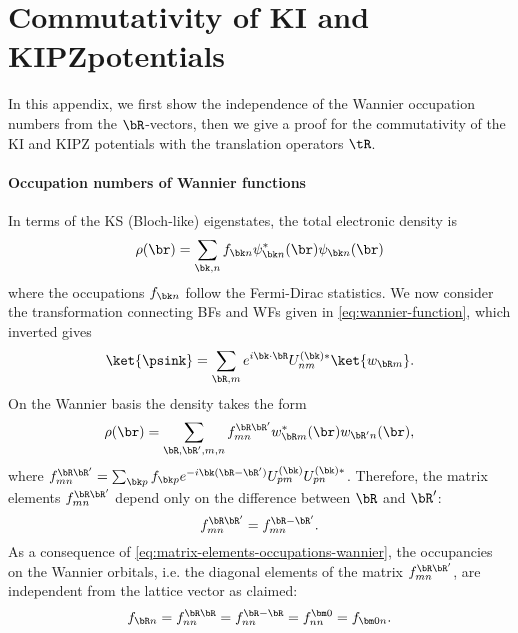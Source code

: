 \chapter[Commutativity of KI and KIPZ potentials]{Commutativity of KI and KIPZ\break potentials\label{app:commutativity-ki-kipz}}
In this appendix, we first show the independence of the Wannier occupation numbers from the $\bR$-vectors, then we give a proof for the commutativity of the KI and KIPZ potentials with the translation operators $\tR$.

\subsubsection*{Occupation numbers of Wannier functions}
In terms of the KS (Bloch-like) eigenstates, the total electronic density is
%
\begin{equation}
    \rho(\br) = \sum_{\bk,n} f_{\bk n} \psi^*_{\bk n}(\br) \psi_{\bk n}(\br)
    \label{eq:density-bloch}
\end{equation}
%
where the occupations $f_{\bk n}$ follow the Fermi-Dirac statistics. We now consider the transformation connecting BFs and WFs given in \cref{eq:wannier-function}, which inverted gives
%
\begin{equation}
    \ket{\psink} = \sum_{\bR,m} e^{i\bk \cdot \bR} U^{(\bk)*}_{nm} \ket{w_{\bR m}} .
    \label{eq:bloch-wannier}
\end{equation}
%
On the Wannier basis the density takes the form
%
\begin{equation}
    \rho(\br) = \sum_{\bR,\bR',m,n} f_{mn}^{\bR\bR'} w^*_{\bR m}(\br) w_{\bR' n}(\br) , 
\end{equation}
%
where $f_{mn}^{\bR\bR'} = \sum_{\bk p} f_{\bk p} e^{-i\bk(\bR-\bR')} U^{(\bk)}_{pm} U^{(\bk)*}_{pn}$. Therefore, the matrix elements $f_{mn}^{\bR\bR'}$ depend only on the difference between $\bR$ and $\bR'$:
\begin{equation}
    f_{mn}^{\bR\bR'} = f_{mn}^{\bR-\bR'} .
    \label{eq:matrix-elements-occupations-wannier}
\end{equation}
%
As a consequence of \cref{eq:matrix-elements-occupations-wannier}, the occupancies on the Wannier orbitals, i.e. the diagonal elements of the matrix $f_{mn}^{\bR\bR'}$, are independent from the lattice vector as claimed:
%
\begin{equation}
    f_{\bR n} = f_{nn}^{\bR\bR} = f_{nn}^{\bR-\bR} = f_{nn}^{\bm 0} = f_{{\bm 0}n} .
\end{equation}

